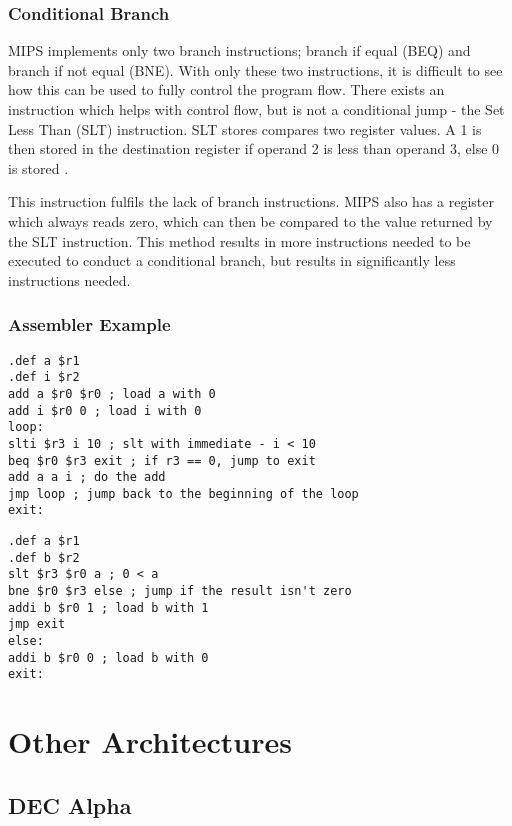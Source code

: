 \documentclass[12pt,a4paper]{article}
\begin{document}
\begin{bibunit}[is-unsrt]
\subsubsection{Conditional Branch}

MIPS implements only two branch instructions; branch if equal (BEQ) and branch if not equal (BNE).
With only these two instructions, it is difficult to see how this can be used to fully control the program flow.
There exists an instruction which helps with control flow, but is not a conditional jump - the Set Less Than (SLT) instruction.
SLT stores compares two register values.
A 1 is then stored in the destination register if operand 2 is less than operand 3, else 0 is stored \cite{patterson2013computer}.

This instruction fulfils the lack of branch instructions.
MIPS also has a register which always reads zero, which can then be compared to the value returned by the SLT instruction.
This method results in more instructions needed to be executed to conduct a conditional branch, but results in significantly less instructions needed.


\subsubsection{Assembler Example}
\begin{lstlisting}[frame=single,caption=MIPS assembler for listing \ref{ListC},label=mips1]
.def a $r1
.def i $r2
add a $r0 $r0 ; load a with 0
add i $r0 0 ; load i with 0
loop:
slti $r3 i 10 ; slt with immediate - i < 10
beq $r0 $r3 exit ; if r3 == 0, jump to exit
add a a i ; do the add
jmp loop ; jump back to the beginning of the loop
exit:
\end{lstlisting}
\begin{lstlisting}[frame=single,caption=MIPS assembler for listing \ref{ListC2},label=mips2]
.def a $r1
.def b $r2
slt $r3 $r0 a ; 0 < a
bne $r0 $r3 else ; jump if the result isn't zero
addi b $r0 1 ; load b with 1
jmp exit
else:
addi b $r0 0 ; load b with 0
exit:
\end{lstlisting}

\section{Other Architectures}
\subsection{DEC Alpha}


\end{bibunit}
\end{document}
